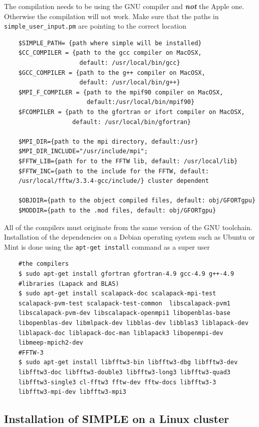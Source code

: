 \documentclass[a4paper,11pt]{article}
\begin{document}
The compilation needs to be using the GNU compiler and \textbf{\textit{not}} the Apple one. Otherwise the compilation will not work. Make sure that the paths in \texttt{simple\_user\_input.pm} are pointing to the correct location

\begin{verbatim}
    $SIMPLE_PATH= {path where simple will be installed}
    $CC_COMPILER = {path to the gcc compiler on MacOSX,
                     default: /usr/local/bin/gcc}
    $GCC_COMPILER = {path to the g++ compiler on MacOSX,
                     default: /usr/local/bin/g++}
    $MPI_F_COMPILER = {path to the mpif90 compiler on MacOSX, 
                       default:/usr/local/bin/mpif90}
    $FCOMPILER = {path to the gfortran or ifort compiler on MacOSX,
                   default: /usr/local/bin/gfortran}

    $MPI_DIR={path to the mpi directory, default:/usr}
    $MPI_DIR_INCLUDE="/usr/include/mpi";
    $FFTW_LIB={path for to the FFTW lib, default: /usr/local/lib}
    $FFTW_INC={path to the include for the FFTW, default:
    /usr/local/fftw/3.3.4-gcc/include/} cluster dependent

    $OBJDIR={path to the object compiled files, default: obj/GFORTgpu}
    $MODDIR={path to the .mod files, default: obj/GFORTgpu}
\end{verbatim}
All of the compilers must originate from the same version of the GNU toolchain. Installation of the dependencies on a Debian operating system such as Ubuntu or Mint is done using the \texttt{apt-get install} command as a super user
\begin{verbatim}
    #the compilers
    $ sudo apt-get install gfortran gfortran-4.9 gcc-4.9 g++-4.9
    #libraries (Lapack and BLAS)
    $ sudo apt-get install scalapack-doc scalapack-mpi-test
    scalapack-pvm-test scalapack-test-common  libscalapack-pvm1
    libscalapack-pvm-dev libscalapack-openmpi1 libopenblas-base
    libopenblas-dev libmlpack-dev libblas-dev libblas3 liblapack-dev
    liblapack-doc liblapack-doc-man liblapack3 libopenmpi-dev
    libmeep-mpich2-dev
    #FFTW-3
    $ sudo apt-get install libfftw3-bin libfftw3-dbg libfftw3-dev
    libfftw3-doc libfftw3-double3 libfftw3-long3 libfftw3-quad3
    libfftw3-single3 cl-fftw3 fftw-dev fftw-docs libfftw3-3
    libfftw3-mpi-dev libfftw3-mpi3 
\end{verbatim}

\subsection{Installation of SIMPLE on a Linux cluster}
\label{inst_clusters_linux}
\end{document}
